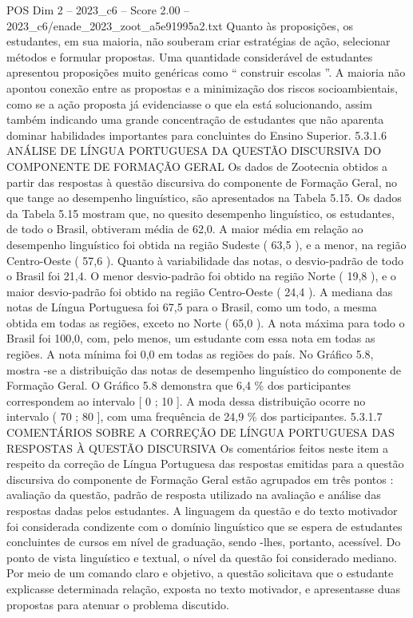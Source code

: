 \begin{textsample}{POS Dim 2 – 2023\_c6 – Score 2.00 – 2023\_c6/enade\_2023\_zoot\_a5e91995a2.txt}
Quanto às proposições, os estudantes, em sua maioria, não souberam criar estratégias de ação, selecionar métodos e formular propostas.
Uma quantidade considerável de estudantes apresentou proposições muito genéricas como “ construir escolas ”.
A maioria não apontou conexão entre as propostas e a minimização dos riscos socioambientais, como se a ação proposta já evidenciasse o que ela está solucionando, assim também indicando uma grande concentração de estudantes que não aparenta dominar habilidades importantes para concluintes do Ensino Superior. 5.3.1.6 ANÁLISE DE LÍNGUA PORTUGUESA DA QUESTÃO DISCURSIVA DO COMPONENTE DE FORMAÇÃO GERAL Os dados de Zootecnia obtidos a partir das respostas à questão discursiva do componente de Formação Geral, no que tange ao desempenho linguístico, são apresentados na Tabela 5.15.
Os dados da Tabela 5.15 mostram que, no quesito desempenho linguístico, os estudantes, de todo o Brasil, obtiveram média de 62,0.
A maior média em relação ao desempenho linguístico foi obtida na região Sudeste ( 63,5 ), e a menor, na região Centro-Oeste ( 57,6 ).
Quanto à variabilidade das notas, o desvio-padrão de todo o Brasil foi 21,4.
O menor desvio-padrão foi obtido na região Norte ( 19,8 ), e o maior desvio-padrão foi obtido na região Centro-Oeste ( 24,4 ).
A mediana das notas de Língua Portuguesa foi 67,5 para o Brasil, como um todo, a mesma obtida em todas as regiões, exceto no Norte ( 65,0 ).
A nota máxima para todo o Brasil foi 100,0, com, pelo menos, um estudante com essa nota em todas as regiões.
A nota mínima foi 0,0 em todas as regiões do país.
No Gráfico 5.8, mostra -se a distribuição das notas de desempenho linguístico do componente de Formação Geral.
O Gráfico 5.8 demonstra que 6,4 \% dos participantes correspondem ao intervalo [ 0 ; 10 ].
A moda dessa distribuição ocorre no intervalo ( 70 ; 80 ], com uma frequência de 24,9 \% dos participantes. 5.3.1.7 COMENTÁRIOS SOBRE A CORREÇÃO DE LÍNGUA PORTUGUESA DAS RESPOSTAS À QUESTÃO DISCURSIVA Os comentários feitos neste item a respeito da correção de Língua Portuguesa das respostas emitidas para a questão discursiva do componente de Formação Geral estão agrupados em três pontos : avaliação da questão, padrão de resposta utilizado na avaliação e análise das respostas dadas pelos estudantes.
A linguagem da questão e do texto motivador foi considerada condizente com o domínio linguístico que se espera de estudantes concluintes de cursos em nível de graduação, sendo -lhes, portanto, acessível.
Do ponto de vista linguístico e textual, o nível da questão foi considerado mediano.
Por meio de um comando claro e objetivo, a questão solicitava que o estudante explicasse determinada relação, exposta no texto motivador, e apresentasse duas propostas para atenuar o problema discutido.

\end{textsample}
